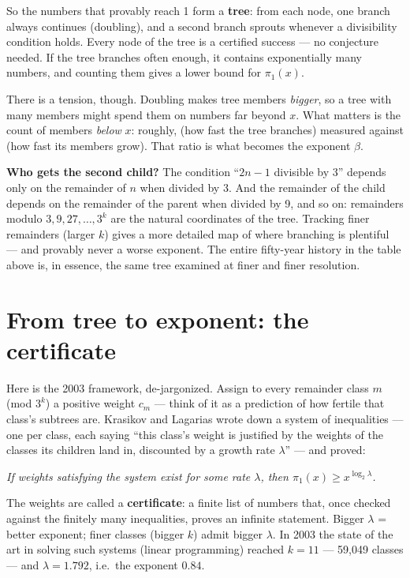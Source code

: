 \documentclass[11pt]{article}
\begin{document}
So the numbers that provably reach 1 form a \textbf{tree}: from each
node, one branch always continues (doubling), and a second branch
sprouts whenever a divisibility condition holds. Every node of the tree
is a certified success --- no conjecture needed. If the tree branches
often enough, it contains exponentially many numbers, and counting them
gives a lower bound for $\pi_1(x)$.

There is a tension, though. Doubling makes tree members \emph{bigger},
so a tree with many members might spend them on numbers far beyond
$x$. What matters is the count of members \emph{below} $x$: roughly,
(how fast the tree branches) measured against (how fast its members
grow). That ratio is what becomes the exponent $\beta$.

\begin{keyidea}
\textbf{Who gets the second child?} The condition ``$2n-1$ divisible by
3'' depends only on the remainder of $n$ when divided by 3. And the
remainder of the child depends on the remainder of the parent when
divided by 9, and so on: remainders modulo $3, 9, 27, \ldots, 3^k$ are
the natural coordinates of the tree. Tracking finer remainders (larger
$k$) gives a more detailed map of where branching is plentiful --- and
provably never a worse exponent. The entire fifty-year history in the
table above is, in essence, the same tree examined at finer and finer
resolution.
\end{keyidea}

\section{From tree to exponent: the certificate}

Here is the 2003 framework, de-jargonized. Assign to every remainder
class $m$ (mod $3^k$) a positive weight $c_m$ --- think of it as a
prediction of how fertile that class's subtrees are. Krasikov and
Lagarias wrote down a system of inequalities --- one per class, each
saying ``this class's weight is justified by the weights of the classes
its children land in, discounted by a growth rate $\lambda$'' --- and
proved:

\begin{center}
\emph{If weights satisfying the system exist for some rate $\lambda$,
then $\pi_1(x) \ge x^{\log_2 \lambda}$.}
\end{center}

The weights are called a \textbf{certificate}: a finite list of numbers
that, once checked against the finitely many inequalities, proves an
infinite statement. Bigger $\lambda$ = better exponent; finer classes
(bigger $k$) admit bigger $\lambda$. In 2003 the state of the art in
solving such systems (linear programming) reached $k = 11$ --- 59{,}049
classes --- and $\lambda = 1.792$, i.e.\ the exponent $0.84$.
\end{document}
